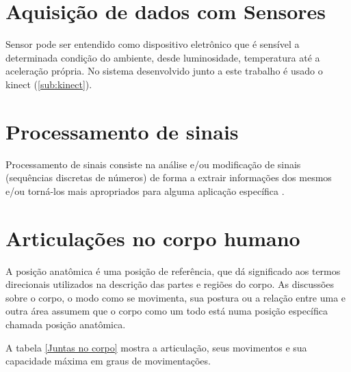   \section{Aquisição de dados com Sensores}
  \label{sec:aquisicaoSensores}

    Sensor pode ser entendido como dispositivo eletrônico que é sensível a determinada
  condição do ambiente, desde luminosidade, temperatura até a aceleração própria.
  No sistema desenvolvido junto a este trabalho é usado o kinect (\ref{sub:kinect}).


  \section{Processamento de sinais}
  \label{sec:processamentoSinais}
  Processamento de sinais consiste na análise e/ou modificação de sinais
(sequências discretas de números) de forma a extrair
informações dos mesmos e/ou torná-los mais apropriados para alguma aplicação específica \cite{processamentoSinais}.

   \section{Articulações no corpo humano}
   \label{sec:Juntas no corpo humano}
    A posição anatômica é uma posição de referência, que dá significado aos termos
    direcionais utilizados na descrição das partes e regiões do corpo. As discussões
    sobre o corpo, o modo como se movimenta, sua postura ou a relação entre uma e
   outra área assumem que o corpo como um todo está numa posição específica chamada
    posição anatômica.

     A tabela \ref{Juntas no corpo} mostra a articulação, seus movimentos e sua capacidade máxima em
   graus de movimentações.

